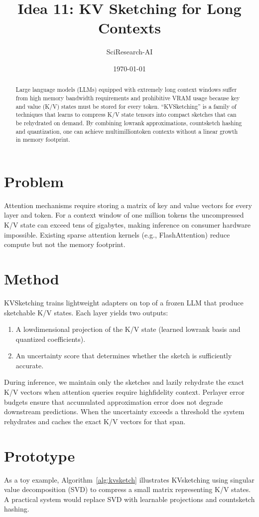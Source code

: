 \documentclass{article}
\title{Idea 11: KV Sketching for Long Contexts}
\author{SciResearch-AI}
\date{\today}
\begin{document}
\maketitle

\begin{abstract}
Large language models (LLMs) equipped with extremely long context windows suffer from high memory bandwidth requirements and prohibitive VRAM usage because key and value (K/V) states must be stored for every token.  ``KV\-Sketching'' is a family of techniques that learns to compress K/V state tensors into compact sketches that can be rehydrated on demand.  By combining low\-rank approximations, count\-sketch hashing and quantization, one can achieve multi\-million\-token contexts without a linear growth in memory footprint.
\end{abstract}

\section{Problem}
Attention mechanisms require storing a matrix of key and value vectors for every layer and token.  For a context window of one million tokens the uncompressed K/V state can exceed tens of gigabytes, making inference on consumer hardware impossible.  Existing sparse attention kernels (e.g., FlashAttention) reduce compute but not the memory footprint.

\section{Method}
KV\-Sketching trains lightweight adapters on top of a frozen LLM that produce sketchable K/V states.  Each layer yields two outputs:
\begin{enumerate}
  \item A low\-dimensional projection of the K/V state (learned low\-rank basis and quantized coefficients).
  \item An uncertainty score that determines whether the sketch is sufficiently accurate.
\end{enumerate}
During inference, we maintain only the sketches and lazily rehydrate the exact K/V vectors when attention queries require high\-fidelity context.  Per\-layer error budgets ensure that accumulated approximation error does not degrade downstream predictions.  When the uncertainty exceeds a threshold the system rehydrates and caches the exact K/V vectors for that span.

\section{Prototype}
As a toy example, Algorithm~\ref{alg:kvsketch} illustrates KV\-sketching using singular value decomposition (SVD) to compress a small matrix representing K/V states.  A practical system would replace SVD with learnable projections and count\-sketch hashing.
\end{document}
